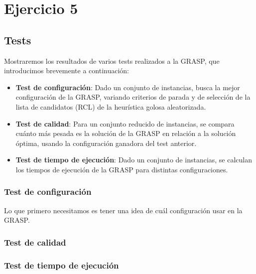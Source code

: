 \section{Ejercicio 5}

\subsection{Tests}
Mostraremos los resultados de varios tests realizados a la GRASP, que introducimos brevemente a continuación:
\begin{itemize}
    \item \textbf{Test de configuración}: Dado un conjunto de instancias, busca la mejor configuración de la GRASP, variando criterios de parada y de selección de la lista de candidatos (RCL) de la heurística golosa aleatorizada.
    \item \textbf{Test de calidad}: Para un conjunto reducido de instancias, se compara cuánto más pesada es la solución de la GRASP en relación a la solución óptima, usando la configuración ganadora del test anterior.
    \item \textbf{Test de tiempo de ejecución}: Dado un conjunto de instancias, se calculan los tiempos de ejecución de la GRASP para distintas configuraciones.
\end{itemize}


\subsubsection{Test de configuración}

Lo que primero necesitamos es tener una idea de cuál configuración usar en la GRASP.


\subsubsection{Test de calidad}


\subsubsection{Test de tiempo de ejecución}

